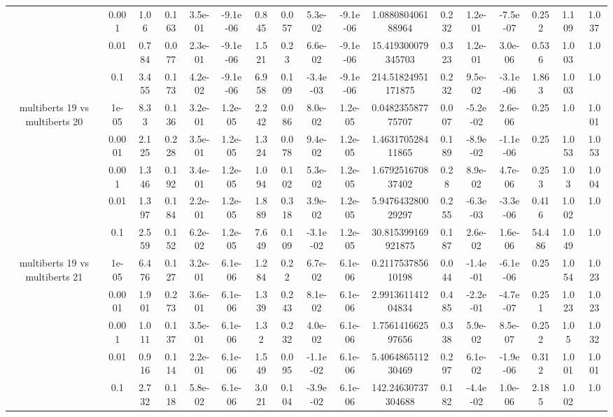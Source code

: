 \begin{tabular}{|c|c|c|c|c|c|c|c|c|c|c|c|c|c|c|c|c|}
 & 0.001 & 1.06 & 0.163 & 3.5e-01 & -9.1e-06 & 0.845 & 0.057 & 5.3e-02 & -9.1e-06 & 1.088080406188964 & 0.232 & 1.2e-01 & -7.5e-07 & 0.252 & 1.109 & 1.037 \\
 & 0.01 & 0.784 & 0.077 & 2.3e-01 & -9.1e-06 & 1.521 & 0.23 & 6.6e-02 & -9.1e-06 & 15.419300079345703 & 0.323 & 1.2e-01 & 3.0e-06 & 0.536 & 1.003 & 1.0 \\
 & 0.1 & 3.455 & 0.173 & 4.2e-02 & -9.1e-06 & 6.958 & 0.109 & -3.4e-03 & -9.1e-06 & 214.51824951171875 & 0.232 & 9.5e-02 & -3.1e-06 & 1.863 & 1.003 & 1.0 \\
\hline
\multirow{5}{*}{multiberts 19 vs multiberts 20} & 1e-05 & 8.33 & 0.136 & 3.2e-01 & 1.2e-05 & 2.242 & 0.086 & 8.0e-02 & 1.2e-05 & 0.048235587775707 & 0.007 & -5.2e-02 & 2.6e-06 & 0.25 & 1.0 & 1.001 \\
 & 0.0001 & 2.125 & 0.228 & 3.5e-01 & 1.2e-05 & 1.324 & 0.078 & 9.4e-02 & 1.2e-05 & 1.463170528411865 & 0.189 & -8.9e-02 & -1.1e-06 & 0.25 & 1.053 & 1.053 \\
 & 0.001 & 1.346 & 0.192 & 3.4e-01 & 1.2e-05 & 1.094 & 0.102 & 5.3e-02 & 1.2e-05 & 1.679251670837402 & 0.28 & 8.9e-02 & 4.7e-06 & 0.253 & 1.03 & 1.004 \\
 & 0.01 & 1.397 & 0.184 & 2.2e-01 & 1.2e-05 & 1.889 & 0.318 & 3.9e-02 & 1.2e-05 & 5.947643280029297 & 0.255 & -6.3e-03 & -3.3e-06 & 0.416 & 1.002 & 1.0 \\
 & 0.1 & 2.559 & 0.152 & 6.2e-02 & 1.2e-05 & 7.649 & 0.109 & -3.1e-02 & 1.2e-05 & 30.815399169921875 & 0.187 & 2.6e-02 & 1.6e-06 & 54.486 & 1.049 & 1.0 \\
\hline
\multirow{5}{*}{multiberts 19 vs multiberts 21} & 1e-05 & 6.476 & 0.127 & 3.2e-01 & 6.1e-06 & 1.284 & 0.22 & 6.7e-02 & 6.1e-06 & 0.211753785610198 & 0.044 & -1.4e-01 & -6.1e-06 & 0.25 & 1.054 & 1.023 \\
 & 0.0001 & 1.901 & 0.273 & 3.6e-01 & 6.1e-06 & 1.339 & 0.243 & 8.1e-02 & 6.1e-06 & 2.991361141204834 & 0.485 & -2.2e-01 & -4.7e-07 & 0.251 & 1.023 & 1.023 \\
 & 0.001 & 1.011 & 0.137 & 3.5e-01 & 6.1e-06 & 1.32 & 0.232 & 4.0e-02 & 6.1e-06 & 1.756141662597656 & 0.338 & 5.9e-02 & 8.5e-07 & 0.252 & 1.05 & 1.032 \\
 & 0.01 & 0.916 & 0.114 & 2.2e-01 & 6.1e-06 & 1.549 & 0.095 & -1.1e-02 & 6.1e-06 & 5.406486511230469 & 0.297 & 6.1e-02 & -1.9e-06 & 0.312 & 1.001 & 1.001 \\
 & 0.1 & 2.732 & 0.118 & 5.8e-02 & 6.1e-06 & 3.021 & 0.104 & -3.9e-02 & 6.1e-06 & 142.24630737304688 & 0.182 & -4.4e-02 & 1.0e-06 & 2.185 & 1.002 & 1.0 \\

\end{tabular}
